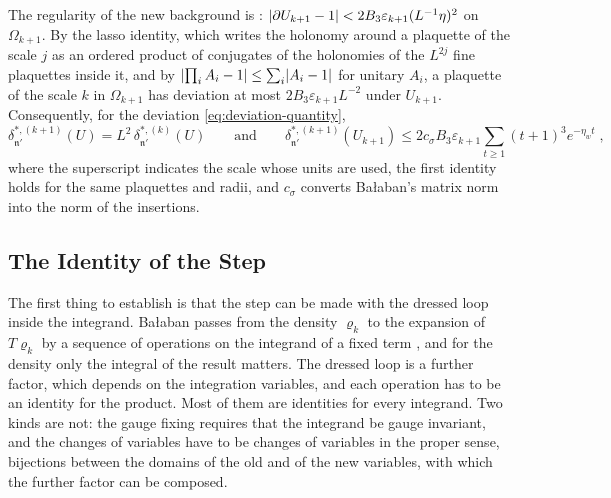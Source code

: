 \documentclass[11pt]{preprint}
\DeclarePairedDelimiter{\abs}{\lvert}{\rvert}
\numberwithin{equation}{section}
\theoremstyle{definition}
\theoremstyle{remark}
\theoremstyle{plain}
\begin{document}
The regularity of the new background is \cite[p.~268]{BalabanCRE}: $\abs{\partial U_{k+1} - 1} < 2B_3\varepsilon_{k+1}(L^{-1}\eta)^2$ on $\Omega_{k+1}$. By the lasso identity, which writes the holonomy around a plaquette of the scale $j$ as an ordered product of conjugates of the holonomies of the $L^{2j}$ fine plaquettes inside it, and by $\abs{\prod_iA_i - 1} \leq \sum_i\abs{A_i - 1}$ for unitary $A_i$, a plaquette of the scale $k$ in $\Omega_{k+1}$ has deviation at most $2B_3\varepsilon_{k+1}L^{-2}$ under $U_{k+1}$. Consequently, for the deviation \eqref{eq:deviation-quantity},
\begin{equation}\label{eq:deviation-scaling}
    \delta^{*,(k+1)}_{\mathfrak n'}(U) = L^2\,\delta^{*,(k)}_{\mathfrak n'}(U)
    \qquad\text{and}\qquad
    \delta^{*,(k+1)}_{\mathfrak n'}(U_{k+1}) \leq 2c_\sigma B_3\varepsilon_{k+1}\sum_{t \geq 1}(t + 1)^3e^{-\eta_wt}\;,
\end{equation}
where the superscript indicates the scale whose units are used, the first identity holds for the same plaquettes and radii, and $c_\sigma$ converts Ba{\l}aban's matrix norm into the norm of the insertions.

\subsection{The Identity of the Step}\label{sec:step-identity}

The first thing to establish is that the step can be made with the dressed loop inside the integrand. Ba{\l}aban passes from the density $\varrho_k$ to the expansion of $T\varrho_k$ by a sequence of operations on the integrand of a fixed term \cite[pp.~264--270]{BalabanCRE}, and for the density only the integral of the result matters. The dressed loop is a further factor, which depends on the integration variables, and each operation has to be an identity for the product. Most of them are identities for every integrand. Two kinds are not: the gauge fixing requires that the integrand be gauge invariant, and the changes of variables have to be changes of variables in the proper sense, bijections between the domains of the old and of the new variables, with which the further factor can be composed.
\end{document}
